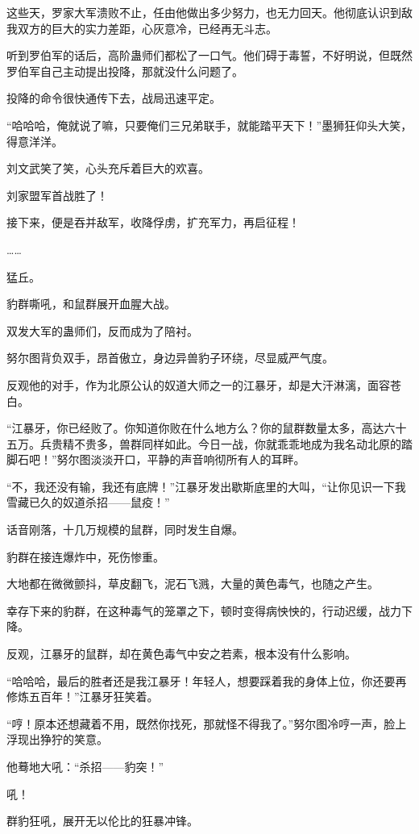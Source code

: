 \begin{this_body}
这些天，罗家大军溃败不止，任由他做出多少努力，也无力回天。他彻底认识到敌我双方的巨大的实力差距，心灰意冷，已经再无斗志。

听到罗伯军的话后，高阶蛊师们都松了一口气。他们碍于毒誓，不好明说，但既然罗伯军自己主动提出投降，那就没什么问题了。

投降的命令很快通传下去，战局迅速平定。

“哈哈哈，俺就说了嘛，只要俺们三兄弟联手，就能踏平天下！”墨狮狂仰头大笑，得意洋洋。

刘文武笑了笑，心头充斥着巨大的欢喜。

刘家盟军首战胜了！

接下来，便是吞并敌军，收降俘虏，扩充军力，再启征程！

……

猛丘。

豹群嘶吼，和鼠群展开血腥大战。

双发大军的蛊师们，反而成为了陪衬。

努尔图背负双手，昂首傲立，身边异兽豹子环绕，尽显威严气度。

反观他的对手，作为北原公认的奴道大师之一的江暴牙，却是大汗淋漓，面容苍白。

“江暴牙，你已经败了。你知道你败在什么地方么？你的鼠群数量太多，高达六十五万。兵贵精不贵多，兽群同样如此。今日一战，你就乖乖地成为我名动北原的踏脚石吧！”努尔图淡淡开口，平静的声音响彻所有人的耳畔。

“不，我还没有输，我还有底牌！”江暴牙发出歇斯底里的大叫，“让你见识一下我雪藏已久的奴道杀招——鼠疫！”

话音刚落，十几万规模的鼠群，同时发生自爆。

豹群在接连爆炸中，死伤惨重。

大地都在微微颤抖，草皮翻飞，泥石飞溅，大量的黄色毒气，也随之产生。

幸存下来的豹群，在这种毒气的笼罩之下，顿时变得病怏怏的，行动迟缓，战力下降。

反观，江暴牙的鼠群，却在黄色毒气中安之若素，根本没有什么影响。

“哈哈哈，最后的胜者还是我江暴牙！年轻人，想要踩着我的身体上位，你还要再修炼五百年！”江暴牙狂笑着。

“哼！原本还想藏着不用，既然你找死，那就怪不得我了。”努尔图冷哼一声，脸上浮现出狰狞的笑意。

他蓦地大吼：“杀招——豹突！”

吼！

群豹狂吼，展开无以伦比的狂暴冲锋。


\end{this_body}
